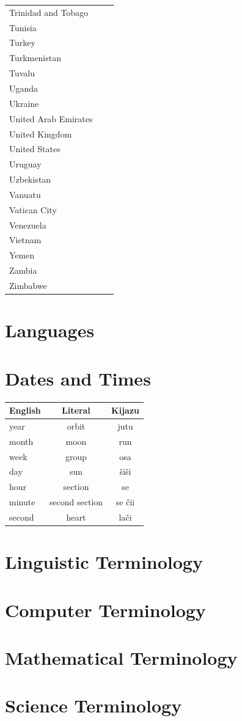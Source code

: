 \documentclass{clgrammar}
\begin{document}
\begin{longtable}{lll}
	Trinidad and Tobago &  &  \\
	Tunisia &  &  \\
	Turkey &  &  \\
	Turkmenistan &  &  \\
	Tuvalu &  &  \\
	Uganda &  &  \\
	Ukraine &  &  \\
	United Arab Emirates &  &  \\
	United Kingdom &  &  \\
	United States &  &  \\
	Uruguay &  &  \\
	Uzbekistan &  &  \\
	Vanuatu &  &  \\
	Vatican City &  &  \\
	Venezuela &  &  \\
	Vietnam &  &  \\
	Yemen &  &  \\
	Zambia &  &  \\
	Zimbabwe &  &  \\

\end{longtable}

\chapter{Languages}
\chapter{Dates and Times}
\begin{center}
	\begin{tabular}{l|c|c}
		\textbf{English} & \textbf{Literal} & \textbf{Kijazu} \\
	\hline
	year    & orbit   & jutu \\ 
	month   & moon    & run \\
	week    & group   & osa \\
	day     & sun     & šiši\\
	hour    & section & se \\
	minute  & second section & se čii \\
	second  & heart   & lači \\  
\end{tabular}
\end{center}



\chapter{Linguistic Terminology}
\chapter{Computer Terminology}
\chapter{Mathematical Terminology}
\chapter{Science Terminology}
\printbibliography
\end{document}

